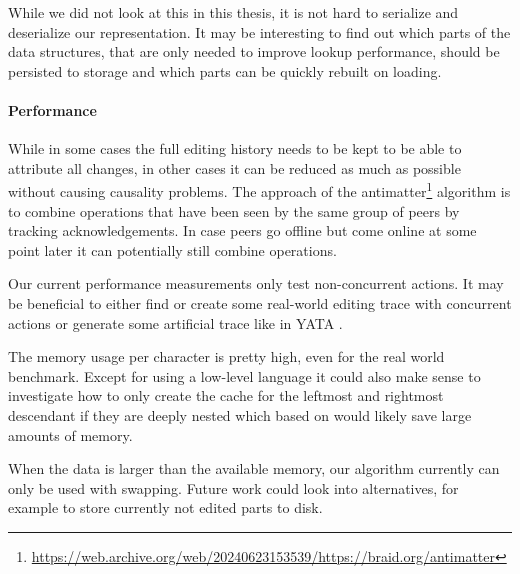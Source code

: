 While we did not look at this in this thesis, it is not hard to serialize and deserialize our representation. It may be interesting to find out which parts of the data structures, that are only needed to improve lookup performance, should be persisted to storage and which parts can be quickly rebuilt on loading.

\paragraph{Performance} \label{section:future-work-performance}

While in some cases the full editing history needs to be kept to be able to attribute all changes, in other cases it can be reduced as much as possible without causing causality problems. The approach of the antimatter\footnote{\url{https://web.archive.org/web/20240623153539/https://braid.org/antimatter}} algorithm is to combine operations that have been seen by the same group of peers by tracking acknowledgements. In case peers go offline but come online at some point later it can potentially still combine operations.

Our current performance measurements only test non-concurrent actions. It may be beneficial to either find or create some real-world editing trace with concurrent actions or generate some artificial trace like in YATA \cite[Section 6.1]{2016-yata-yjs}.

The memory usage per character is pretty high, even for the real world benchmark. Except for using a low-level language it could also make sense to investigate how to only create the cache for the leftmost and rightmost descendant if they are deeply nested which based on  would likely save large amounts of memory.

When the data is larger than the available memory, our algorithm currently can only be used with swapping. Future work could look into alternatives, for example to store currently not edited parts to disk.
